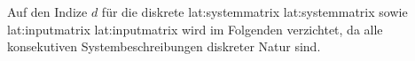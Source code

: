 Auf den Indize \(d\) für die diskrete \glsdesc{lat:systemmatrix} \gls{lat:systemmatrix}
sowie \glsdesc{lat:inputmatrix} \gls{lat:inputmatrix} wird im Folgenden verzichtet, da alle konsekutiven Systembeschreibungen diskreter Natur sind.

